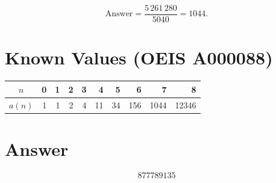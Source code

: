 \documentclass[11pt]{article}
\theoremstyle{definition}
\begin{document}
\[
\text{Answer} = \frac{5\,261\,280}{5040} = 1044.
\]

\section{Known Values (OEIS A000088)}

\begin{center}
\begin{tabular}{crrrrrrrrr}
\toprule
$n$ & 0 & 1 & 2 & 3 & 4 & 5 & 6 & 7 & 8 \\
\midrule
$a(n)$ & 1 & 1 & 2 & 4 & 11 & 34 & 156 & 1044 & 12346 \\
\bottomrule
\end{tabular}
\end{center}

\section{Answer}

\[
\boxed{877789135}
\]
\end{document}
